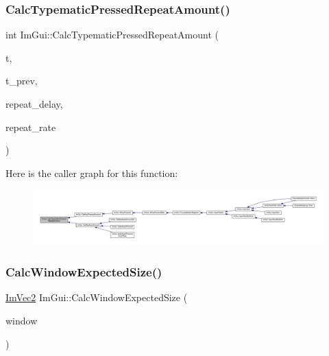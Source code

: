 \subsubsection{\texorpdfstring{Calc\+Typematic\+Pressed\+Repeat\+Amount()}{CalcTypematicPressedRepeatAmount()}}
{\footnotesize\ttfamily int Im\+Gui\+::\+Calc\+Typematic\+Pressed\+Repeat\+Amount (\begin{DoxyParamCaption}\item[{float}]{t,  }\item[{float}]{t\+\_\+prev,  }\item[{float}]{repeat\+\_\+delay,  }\item[{float}]{repeat\+\_\+rate }\end{DoxyParamCaption})}

Here is the caller graph for this function\+:
\nopagebreak
\begin{figure}[H]
\begin{center}
\leavevmode
\includegraphics[width=350pt]{namespace_im_gui_ad3af0fc327467a44116d7d04018b9124_icgraph}
\end{center}
\end{figure}
\mbox{\label{namespace_im_gui_ae81c20afd5ce4b663f48d05c40af93f9}} 
\subsubsection{\texorpdfstring{Calc\+Window\+Expected\+Size()}{CalcWindowExpectedSize()}}
{\footnotesize\ttfamily \mbox{\hyperlink{struct_im_vec2}{Im\+Vec2}} Im\+Gui\+::\+Calc\+Window\+Expected\+Size (\begin{DoxyParamCaption}\item[{\mbox{\hyperlink{struct_im_gui_window}{Im\+Gui\+Window}} $\ast$}]{window }\end{DoxyParamCaption})}

\mbox{\label{namespace_im_gui_a66416151e58c34cd02973976de66e0e9}} 
